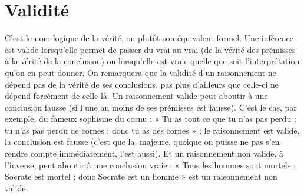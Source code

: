 \section{Validité}
C’est le nom logique de la vérité, ou plutôt son équivalent formel.
Une inférence est valide lorsqu’elle permet de passer du vrai
au vrai (de la vérité des prémisses à la vérité de la conclusion) ou lorsqu'elle est
vraie quelle que soit l'interprétation qu’on en peut donner. On remarquera que
la validité d’un raisonnement ne dépend pas de la vérité de ses conclusions, pas
plus d’ailleurs que celle-ci ne dépend forcément de celle-là. Un raisonnement
valide peut aboutir à une conclusion fausse (si l’une au moins de ses prémisses
est fausse). C’est le cas, par exemple, du fameux sophisme du cornu : « Tu as
tout ce que tu n’as pas perdu ; tu n’as pas perdu de cornes ; donc tu as des
cornes » ; le raisonnement est valide, la conclusion est fausse (c’est que la.
majeure, quoique on puisse ne pas s’en rendre compte immédiatement, l’est
aussi). Et un raisonnement non valide, à l’inverse, peut aboutir à une conclusion
vraie : « Tous les hommes sont mortels ; Socrate est mortel ; donc Socrate
est un homme » est un raisonnement non valide.

